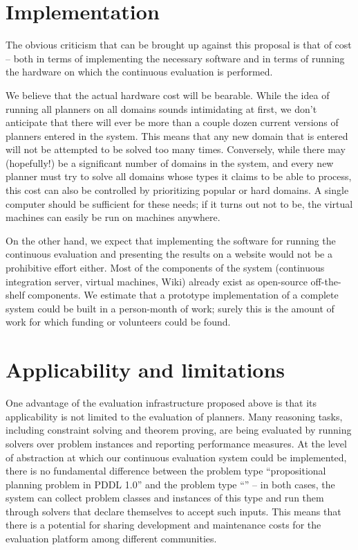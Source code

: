 \section{Implementation}

The obvious criticism that can be brought up against this proposal is
that of cost -- both in terms of implementing the necessary software
and in terms of running the hardware on which the continuous
evaluation is performed.

We believe that the actual hardware cost will be bearable.  While the
idea of running all planners on all domains sounds intimidating at
first, we don't anticipate that there will ever be more than a couple
dozen current versions of planners entered in the system.  This means
that any new domain that is entered will not be attempted to be solved
too many times.  Conversely, while there may (hopefully!) be a
significant number of domains in the system, and every new planner
must try to solve all domains whose types it claims to be able to
process, this cost can also be controlled by prioritizing popular or
hard domains.  A single computer should be sufficient for these needs;
if it turns out not to be, the virtual machines can easily be run on
machines anywhere.

On the other hand, we expect that implementing the software for
running the continuous evaluation and presenting the results on a
website would not be a prohibitive effort either.  Most of the
components of the system (continuous integration server, virtual
machines, Wiki) already exist as open-source off-the-shelf
components.  We estimate that a prototype implementation of a complete
system could be built in a person-month of work; surely this is the
amount of work for which funding or volunteers could be found.






\section{Applicability and limitations}

One advantage of the evaluation infrastructure proposed above is that
its applicability is not limited to the evaluation of planners.  Many
reasoning tasks, including constraint solving and theorem proving, are
being evaluated by running solvers over problem instances and
reporting performance measures.  At the level of abstraction at which
our continuous evaluation system could be implemented, there is no
fundamental difference between the problem type ``propositional
planning problem in PDDL 1.0'' and the problem type ``'' -- in both cases, the system can collect
problem classes and instances of this type and run them through
solvers that declare themselves to accept such inputs.  This means
that there is a potential for sharing development and maintenance
costs for the evaluation platform among different communities.

